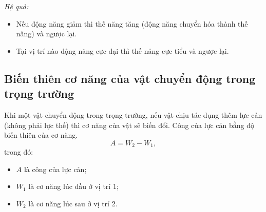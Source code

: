 \textit{Hệ quả:}
\begin{itemize}
	\item Nếu động năng giảm thì thế năng tăng (động năng chuyển hóa thành thế năng) và ngược lại.
	\item Tại vị trí nào động năng cực đại thì thế năng cực tiểu và ngược lại.
\end{itemize}
\subsection{Biến thiên cơ năng của vật chuyển động trong trọng trường}
Khi một vật chuyển động trong trọng trường, nếu vật chịu tác dụng thêm lực cản (không phải lực thế) thì cơ năng của vật sẽ biến đổi. Công của lực cản bằng độ biến thiên của cơ năng.
\begin{equation*}
	A=W_2-W_1,
\end{equation*}
trong đó:
\begin{itemize}
	\item $A$ là công của lực cản;
	\item $W_1$ là cơ năng lúc đầu ở vị trí 1;
	\item $W_2$ là cơ năng lúc sau ở vị trí 2.
\end{itemize}

